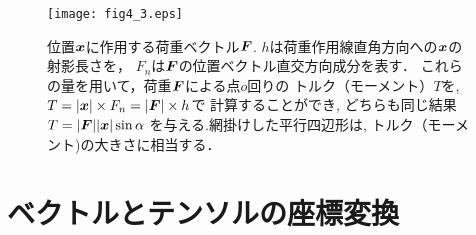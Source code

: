 \documentclass[10pt,a4j]{jarticle}
\begin{document}
\begin{figure}[h]
	\begin{center}
	\texttt{[image: fig4\_3.eps]} 
	\end{center}
	\caption{位置$\mbox{\boldmath $x$}$に作用する荷重ベクトル$\mbox{\boldmath $F$}$.
	$h$は荷重作用線直角方向への$\mbox{\boldmath $x$}$の射影長さを，
	$F_n$は$\mbox{\boldmath $F$}$の位置ベクトル直交方向成分を表す．
	これらの量を用いて，荷重$\mbox{\boldmath $F$}$による点$o$回りの
	トルク（モーメント）$T$を,$T=|\mbox{\boldmath $x$}|\times F_n=|\mbox{\boldmath $F$}|\times h$で
	計算することができ, どちらも同じ結果$T=|\mbox{\boldmath $F$}| |\mbox{\boldmath $x$}|\sin\alpha$
	を与える.網掛けした平行四辺形は, トルク（モーメント)の大きさに相当する．
	 } 
	\label{fig:fig4_2}
\end{figure}
\section{ベクトルとテンソルの座標変換}
\end{document}

